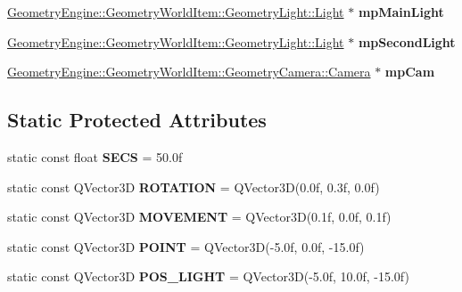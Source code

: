 \begin{DoxyCompactItemize}
\mbox{\hyperlink{class_geometry_engine_1_1_geometry_world_item_1_1_geometry_light_1_1_light}{Geometry\+Engine\+::\+Geometry\+World\+Item\+::\+Geometry\+Light\+::\+Light}} $\ast$ {\bfseries mp\+Main\+Light}
\item 
\mbox{\label{class_unit_test_1_1_c_translucent_shadowing_test_a4fd0b7d0b44f0e846cb964099958d292}} 
\mbox{\hyperlink{class_geometry_engine_1_1_geometry_world_item_1_1_geometry_light_1_1_light}{Geometry\+Engine\+::\+Geometry\+World\+Item\+::\+Geometry\+Light\+::\+Light}} $\ast$ {\bfseries mp\+Second\+Light}
\item 
\mbox{\label{class_unit_test_1_1_c_translucent_shadowing_test_a5ae0d035405da80509e17260b01a642c}} 
\mbox{\hyperlink{class_geometry_engine_1_1_geometry_world_item_1_1_geometry_camera_1_1_camera}{Geometry\+Engine\+::\+Geometry\+World\+Item\+::\+Geometry\+Camera\+::\+Camera}} $\ast$ {\bfseries mp\+Cam}
\end{DoxyCompactItemize}
\subsection*{Static Protected Attributes}
\begin{DoxyCompactItemize}
\item 
\mbox{\label{class_unit_test_1_1_c_translucent_shadowing_test_a3c6db73bed1795598dcec4a0d1f7a616}} 
static const float {\bfseries S\+E\+CS} = 50.\+0f
\item 
\mbox{\label{class_unit_test_1_1_c_translucent_shadowing_test_a5b12e85d53f6413eeabb70f0aa23d017}} 
static const Q\+Vector3D {\bfseries R\+O\+T\+A\+T\+I\+ON} = Q\+Vector3D(0.\+0f, 0.\+3f, 0.\+0f)
\item 
\mbox{\label{class_unit_test_1_1_c_translucent_shadowing_test_aadf508353dd493503af97700b95eccf0}} 
static const Q\+Vector3D {\bfseries M\+O\+V\+E\+M\+E\+NT} = Q\+Vector3D(0.\+1f, 0.\+0f, 0.\+1f)
\item 
\mbox{\label{class_unit_test_1_1_c_translucent_shadowing_test_a01fb6c0f7a79af7ca28c6162c18c7fae}} 
static const Q\+Vector3D {\bfseries P\+O\+I\+NT} = Q\+Vector3D(-\/5.\+0f, 0.\+0f, -\/15.\+0f)
\item 
\mbox{\label{class_unit_test_1_1_c_translucent_shadowing_test_a8d11e373ff78746caead82b12f5bb949}} 
static const Q\+Vector3D {\bfseries P\+O\+S\+\_\+\+L\+I\+G\+HT} = Q\+Vector3D(-\/5.\+0f, 10.\+0f, -\/15.\+0f)
\end{DoxyCompactItemize}


